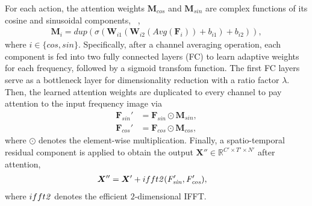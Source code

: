 \documentclass{article}
\begin{document}
For each action, the attention weights {\myfont$ \bm{M}_{cos} $} and {\myfont$ \bm{M}_{sin} $} are complex functions of its cosine and sinusoidal components, \ie~, {\myfont
	\begin{align}
	\bm{M}_i = dup(\sigma(\bm{W}_{i1}(\bm{W}_{i2}(Avg(\bm{F}_{i}))+b_{i1})+b_{i2})),
	\end{align}
}where {\myfont$ i \in \{cos,sin\} $}. Specifically, after a channel averaging operation, each component is fed into two fully connected layers (FC) to learn adaptive weights for each frequency, followed by a sigmoid transfom function. The first FC layers serve as a bottleneck layer \cite{DBLP:conf/cvpr/HeZRS16}  for dimensionality reduction with a ratio factor $ \lambda $. Then, the learned attention weights are duplicated to every channel to pay attention to the input frequency image via
{\myfont
	\begin{align}
	\bm{F}_{sin}'& = \bm{F}_{sin} \odot \bm{M}_{sin},\\
	\bm{F}_{cos}'& = \bm{F}_{cos} \odot \bm{M}_{cos},
	\end{align}
}where $ \odot $ denotes the element-wise multiplication. Finally, a spatio-temporal residual component is applied to obtain the output {\myfont$\bm{X''}\in \mathbb{R}^{C' \times T' \times N'} $} after attention, \ie~
{\myfont
	\begin{align}
	\bm{X}''& = \bm{X}'+ ifft\it{2} (\bm{F}_{sin}',\bm{F}_{cos}'),
	\end{align}
}where {\myfont$ ifft\it{2} $} denotes the efficient $ 2 $-dimensional IFFT.
\end{document}
